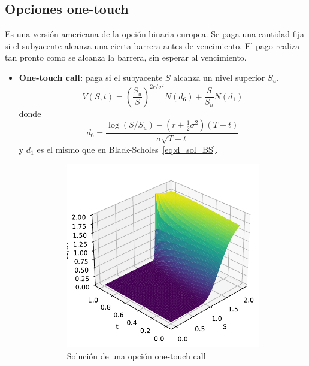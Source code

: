 \subsection{Opciones one-touch}
Es una versión americana de la opción binaria  europea. Se paga una cantidad fija si el subyacente alcanza una cierta barrera antes de vencimiento. El pago realiza tan pronto como se alcanza la barrera, sin esperar al vencimiento.
\begin{itemize}
    \item \textbf{One-touch call:} paga si el subyacente $S$ alcanza un nivel superior $S_u$.
    \[
        \boxed{V(S, t) = \left( \frac{S_u}{S} \right)^{2r/\sigma^2} N(d_6) + \frac{S}{S_u} N(d_1)}
    \]
    donde
    \[
        \boxed{d_6 = \frac{\log(S/S_u) - (r + \frac{1}{2}\sigma^2)(T-t)}{\sigma\sqrt{T-t}}}
    \]
    y $d_1$ es el mismo que en Black-Scholes~\eqref{eq:d_sol_BS}.
    \begin{figure}[H]
        \centering
        \begin{subfigure}[b]{0.35\linewidth}
            \includegraphics[width=\linewidth]{Imagenes/Parte1/9_Americanas/One_Touch_Call.pdf}
            \caption{Solución de una opción one-touch call}
        \end{subfigure}
        \begin{subfigure}[b]{0.35\linewidth}

\end{subfigure}
\end{figure}
\end{itemize}
